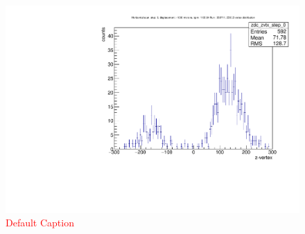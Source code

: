 \begin{figure}
\begin{center}
\includegraphics[width=\linewidth,height=\textheight,keepaspectratio]{./figures/zvertex_profile_hscan_pos_1000_359711}
\caption{ \textcolor{red}{Default Caption} }
\label{fig:zvertex_profile_hscan_pos_1000_359711}
\end{center}
\end{figure}
